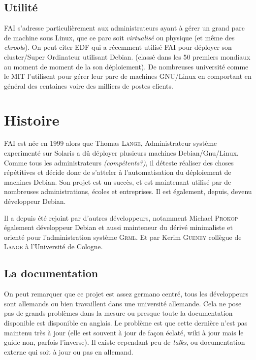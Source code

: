\documentclass[a4paper,12pt,one side,titlepage]{report}
\begin{document}
\subsection{Utilité}
\textsc{FAI} s'adresse particulièrement aux administrateurs ayant à gérer un grand parc de machine sous Linux, que ce parc soit \textit{virtualisé} ou physique (et même des \textit{chroot}s).
On peut citer EDF qui a récemment utilisé FAI pour déployer son cluster/Super Ordinateur utilisant Debian. (classé dans les 50 premiers mondiaux au moment de moment de la son déploiement).
De nombreuses université comme le MIT l'utilisent pour gérer leur parc de machines GNU/Linux en comportant en général des centaines voire des milliers de postes clients.

\section{Histoire}
\textsc{FAI} est née en 1999 alors que Thomas \textsc{Lange}, Administrateur système experimenté sur Solaris a dû déployer plusieurs machines Debian/Gnu/Linux. Comme tous les administrateurs \textit{(compétents?)}, il déteste réaliser des choses répétitives et décide donc de s'atteler à l'automatisation du déploiement de machines Debian. Son projet est un succès, et est maintenant utilisé par de nombreuses administrations, écoles et entreprises.
Il est également, depuis, devenu développeur Debian.

Il a depuis été rejoint par d'autres développeurs, notamment Michael \textsc{Prokop} également développeur Debian et aussi mainteneur du dérivé minimaliste et orienté pour l'administration système \textsc{Grml}.
Et par Kerim \textsc{Gueney} collègue de \textsc{Lange} à l'Université de Cologne.

\subsection{La documentation}
On peut remarquer que ce projet est assez germano centré, tous les développeurs sont allemands ou bien travaillent dans une université allemande.
Cela ne pose pas de grands problèmes dans la mesure ou presque toute la documentation disponible est disponible en anglais.
Le problème est que cette dernière n'est pas maintenu très à jour (elle est souvent à jour de façon éclaté, wiki à jour mais le guide non, parfois l'inverse). Il existe cependant peu de \textit{talks}, ou documentation externe qui soit à jour ou pas en allemand.
\end{document}
